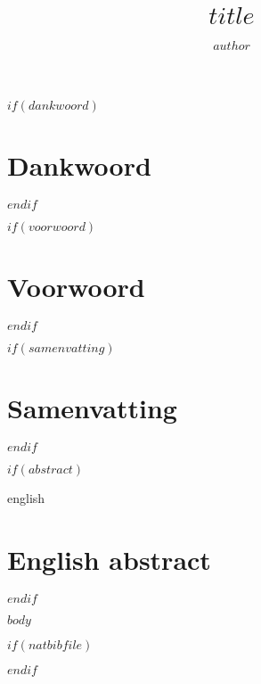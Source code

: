 \documentclass[11pt, twoside]{extreport}
\title{$title$}
\author{$author$}
\begin{document}
\maketitle
{}

$if(dankwoord)$
  \chapter*{Dankwoord}
  
$endif$

$if(voorwoord)$
  \chapter*{Voorwoord}
  
$endif$

$if(samenvatting)$
  \chapter*{Samenvatting}
  
$endif$

$if(abstract)$
  \begin{otherlanguage*}{english}
  \chapter*{English abstract}
  
  \end{otherlanguage*}
$endif$

\tableofcontents
{}

\newpage
{}

$body$

$if(natbibfile)$


$endif$
\end{document}
